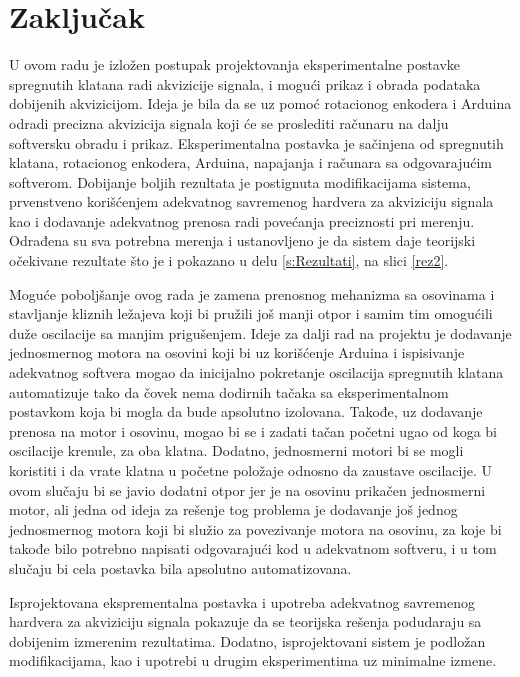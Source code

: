 \documentclass[a4paper, 12pt, diplomski]{etf}
\begin{document}
\break


\section{Zaključak}

U ovom radu je izložen postupak projektovanja eksperimentalne postavke spregnutih klatana radi akvizicije signala, i mogući prikaz i obrada podataka dobijenih akvizicijom. Ideja je bila da se uz pomoć rotacionog enkodera i Arduina odradi precizna akvizicija signala koji će se proslediti računaru na dalju softversku obradu i prikaz. Eksperimentalna postavka je sačinjena od spregnutih klatana, rotacionog enkodera, Arduina, napajanja i računara sa odgovarajućim softverom. Dobijanje boljih rezultata je postignuta modifikacijama sistema, prvenstveno korišćenjem adekvatnog savremenog hardvera za akviziciju signala kao i dodavanje adekvatnog prenosa radi povećanja preciznosti pri merenju. Odrađena su sva potrebna merenja i ustanovljeno je da sistem daje teorijski očekivane rezultate što je i pokazano u delu \ref{s:Rezultati}, na slici \ref{rez2}.

Moguće poboljšanje ovog rada je zamena prenosnog mehanizma sa osovinama i stavljanje kliznih ležajeva koji bi pružili još manji otpor i samim tim omogućili duže oscilacije sa manjim prigušenjem. Ideje za dalji rad na projektu je dodavanje jednosmernog motora na osovini koji bi uz korišćenje Arduina i ispisivanje adekvatnog softvera mogao da inicijalno pokretanje oscilacija spregnutih klatana automatizuje tako da čovek nema dodirnih tačaka sa eksperimentalnom postavkom koja bi mogla da bude apsolutno izolovana. Takođe, uz dodavanje prenosa na motor i osovinu, mogao bi se i zadati tačan početni ugao od koga bi oscilacije krenule, za oba klatna. Dodatno, jednosmerni motori bi se mogli koristiti i da vrate klatna u početne položaje odnosno da zaustave oscilacije. U ovom slučaju bi se javio dodatni otpor jer je na osovinu prikačen jednosmerni motor, ali jedna od ideja za rešenje tog problema je dodavanje još jednog jednosmernog motora koji bi služio za povezivanje motora na osovinu, za koje bi takođe bilo potrebno napisati odgovarajući kod u adekvatnom softveru, i u tom slučaju bi cela postavka bila apsolutno automatizovana.

Isprojektovana eksprementalna postavka i upotreba adekvatnog savremenog hardvera za akviziciju signala pokazuje da se teorijska rešenja podudaraju sa dobijenim izmerenim rezultatima. Dodatno, isprojektovani sistem je podložan modifikacijama, kao i upotrebi u drugim eksperimentima uz minimalne izmene.


\break 



\newpage

\begingroup
\let\clearpage\relax
\listoffigures
\endgroup
\end{document}
